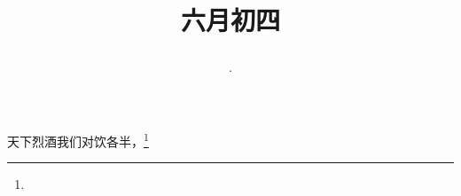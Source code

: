 \title{\date[d=9,m=7,y=2024][year:cn-y,年,month:cn,day:cn,日,·,weekday]·六月初四 }
天下烈酒我们对饮各半，\footnote{ }

